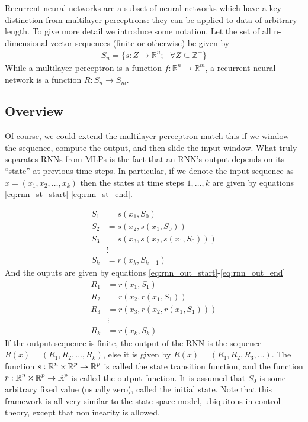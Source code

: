 Recurrent neural networks are a subset of neural networks which have a key distinction from multilayer perceptrons: they can be applied to data of arbitrary length.  To give more detail we introduce some notation.  Let the set of all n-dimensional vector sequences (finite or otherwise) be given by
\begin{align}
S_n = \{s:Z \rightarrow \mathbb{R}^n; \text{ } \forall Z\subseteq\mathbb{Z}^+\}
\end{align}
While a multilayer perceptron is a function $f:\mathbb{R}^n\rightarrow \mathbb{R}^m$, a recurrent neural network is a function $R: S_n \rightarrow S_m$.

\subsection{Overview}

Of course, we could extend the multilayer perceptron match this if we window the sequence, compute the output, and then slide the input window.  What truly separates RNNs from MLPs is the fact that an RNN's output depends on its ``state'' at previous time steps.  In particular, if we denote the input sequence as $x = (x_1,x_2,\dots,x_k)$ then the states at time steps $1,\dots,k$ are given by equations \ref{eq:rnn_st_start}-\ref{eq:rnn_st_end}.

\begin{align}\label{eq:rnn_st_start}
S_1 &= s(x_1,S_0)\\
S_2 &= s(x_2,s(x_1,S_0))\\
S_3 &= s(x_3,s(x_2,s(x_1,S_0)))\\ \nonumber
&\vdots\\
S_k &= r(x_k,S_{k-1})\label{eq:rnn_st_end}
\end{align}
And the ouputs are given by equations \ref{eq:rnn_out_start}-\ref{eq:rnn_out_end}
\begin{align}\label{eq:rnn_out_start}
R_1 &= r(x_1,S_1)\\
R_2 &= r(x_2,r(x_1,S_1))\\
R_3 &= r(x_3,r(x_2,r(x_1,S_1)))\\ \nonumber
&\vdots\\
R_k &= r(x_k,S_{k})\label{eq:rnn_out_end}
\end{align}
If the output sequence is finite, the output of the RNN is the sequence $R(x) = (R_1,R_2,\dots,R_k)$, else it is given by $R(x) = (R_1,R_2,R_3,\dots)$.  The function $s:\operatorname*{\mathbb{R}}^n \times \operatorname*{\mathbb{R}}^p \rightarrow \operatorname*{\mathbb{R}}^p$ is called the state transition function, and the function $r:\operatorname*{\mathbb{R}}^n \times \operatorname*{\mathbb{R}}^p \rightarrow \operatorname*{\mathbb{R}}^p$ is called the output function.  It is assumed that $S_0$ is some arbitrary fixed value (usually zero), called the initial state.  Note that this framework is all very similar to the state-space model, ubiquitous in control theory, except that nonlinearity is allowed.

